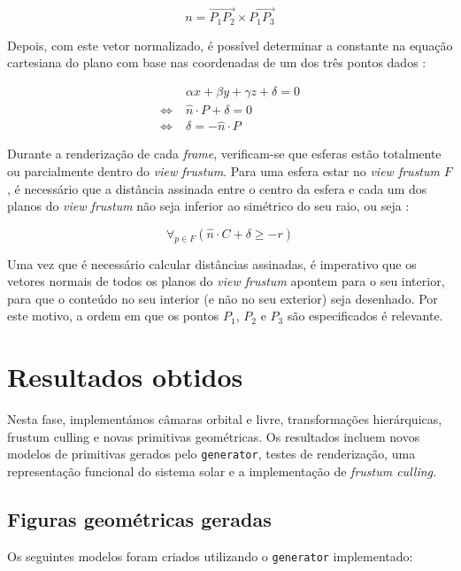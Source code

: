 \documentclass[12pt, a4paper]{article}
\begin{document}
$$
n = \overrightarrow{P_1 P_2} \times \overrightarrow{P_1 P_3}
$$

Depois, com este vetor normalizado, é possível determinar a constante na equação cartesiana do plano
com base nas coordenadas de um dos três pontos dados \cite{lighthouse3d-plane}:

\begin{align*}
                       & \alpha x + \beta y + \gamma z + \delta = 0 \\
    \Leftrightarrow \; & \widehat{n} \cdot P + \delta = 0 \\
    \Leftrightarrow \; & \delta = -\widehat{n} \cdot P
\end{align*}

Durante a renderização de cada \emph{frame}, verificam-se que esferas estão totalmente ou
parcialmente dentro do \emph{view frustum}. Para uma esfera estar no \emph{view frustum} $F$, é
necessário que a distância assinada entre o centro da esfera e cada um dos planos do
\emph{view frustum} não seja inferior ao simétrico do seu raio, ou seja \cite{lighthouse3d-sphere}:

$$
\forall_{p \in F} \left ( \widehat{n} \cdot C + \delta \ge - r \right )
$$

Uma vez que é necessário calcular distâncias assinadas, é imperativo que os vetores normais de todos
os planos do \emph{view frustum} apontem para o seu interior, para que o conteúdo no seu interior (e
não no seu exterior) seja desenhado. \cite{lighthouse3d-frustum-planes} Por este motivo, a ordem em
que os pontos $P_1$, $P_2$ e $P_3$ são especificados é relevante.

\section{Resultados obtidos}

Nesta fase, implementámos câmaras orbital e livre, transformações hierárquicas, frustum culling e
novas primitivas geométricas. Os resultados incluem novos modelos de primitivas gerados pelo
\texttt{generator}, testes de renderização, uma representação funcional do sistema solar e a
implementação de \textit{frustum culling}.

\subsection{Figuras geométricas geradas}

Os seguintes modelos foram criados utilizando o \texttt{generator} implementado:
\end{document}

